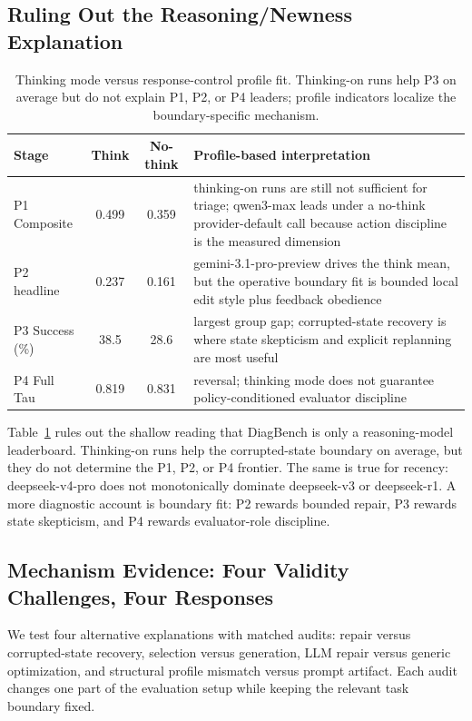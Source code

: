 \subsection{Ruling Out the Reasoning/Newness Explanation}

\begin{table}[t]
\caption{Thinking mode versus response-control profile fit. Thinking-on runs help P3 on average but do not explain P1, P2, or P4 leaders; profile indicators localize the boundary-specific mechanism.}
\label{tab:reasoning_vs_profile}
\centering
\small
\setlength{\tabcolsep}{4.5pt}
\renewcommand{\arraystretch}{1.12}
\begin{tabular}{lccp{70mm}}
\toprule
Stage & Think & No-think & Profile-based interpretation \\
\midrule
P1 Composite & 0.499 & 0.359 & thinking-on runs are still not sufficient for triage; qwen3-max leads under a no-think provider-default call because action discipline is the measured dimension \\
P2 headline & 0.237 & 0.161 & gemini-3.1-pro-preview drives the think mean, but the operative boundary fit is bounded local edit style plus feedback obedience \\
P3 Success (\%) & 38.5 & 28.6 & largest group gap; corrupted-state recovery is where state skepticism and explicit replanning are most useful \\
P4 Full Tau & 0.819 & 0.831 & reversal; thinking mode does not guarantee policy-conditioned evaluator discipline \\
\bottomrule
\end{tabular}
\end{table}

Table~\ref{tab:reasoning_vs_profile} rules out the shallow reading that DiagBench is only a reasoning-model leaderboard. Thinking-on runs help the corrupted-state boundary on average, but they do not determine the P1, P2, or P4 frontier. The same is true for recency: deepseek-v4-pro does not monotonically dominate deepseek-v3 or deepseek-r1. A more diagnostic account is boundary fit: P2 rewards bounded repair, P3 rewards state skepticism, and P4 rewards evaluator-role discipline.

\subsection{Mechanism Evidence: Four Validity Challenges, Four Responses}

We test four alternative explanations with matched audits: repair versus corrupted-state recovery, selection versus generation, LLM repair versus generic optimization, and structural profile mismatch versus prompt artifact. Each audit changes one part of the evaluation setup while keeping the relevant task boundary fixed.

